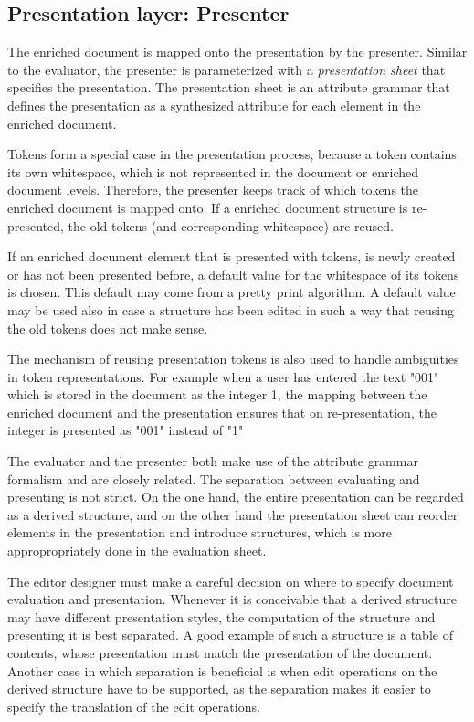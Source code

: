 \subsection{Presentation layer: Presenter} \label{sect:presenter}

The enriched document is mapped onto the presentation by the presenter. Similar to the evaluator, the presenter is parameterized with a {\em presentation sheet} that specifies the presentation. The presentation sheet is an attribute grammar that defines the presentation as a synthesized attribute for each element in the enriched document.

Tokens form a special case in the presentation process, because a token contains its own whitespace, which is not represented in the document or enriched document levels. Therefore, the presenter keeps track of which tokens the enriched document is mapped onto. If a enriched document structure is re-presented, the old tokens (and corresponding white\-space) are reused. 

If an enriched document element that is presented with tokens, is newly created or has not been presented before, a default value for the whitespace of its tokens is chosen. This default may come from a pretty print algorithm. A default value may be used also in case a structure has been edited in such a way that reusing the old tokens does not make sense.

The mechanism of reusing presentation tokens is also used to handle ambiguities in token representations. For example when a user has entered the text "001" which is stored in the document as the integer 1, the mapping between the enriched document and the presentation ensures that on re-presentation, the integer is presented as "001" instead of "1"

The evaluator and the presenter both make use of the attribute grammar formalism and are closely related. The separation between evaluating and presenting is not strict. On the one hand, the entire presentation can be regarded as a derived structure, and on the other hand the presentation sheet can reorder elements in the presentation and introduce structures, which is more appropropriately done in the evaluation sheet. 

The editor designer must make a careful decision on where to specify document evaluation and presentation. Whenever it is conceivable that a derived structure may have different presentation styles, the computation of the structure and presenting it is best separated. A good example of such a structure is a table of contents, whose presentation must match the presentation of the document. Another case in which separation is beneficial is when edit operations on the derived structure have to be supported, as the separation makes it easier to specify the translation of the edit operations. 

